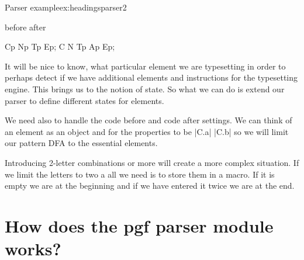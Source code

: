 \begin{texexample}{Parser example}{ex:headingsparser2}
\bgroup
\makeatletter
{}
          
{\boxanelement{\setchapterfont\chaptername}}
{\boxanelement{\setnumberfont\thechapter}} 
{} 
{\breakline} 
{before } 
{after } 

{}

{}

{}

\def\boxanelement#1{\fbox{\LARGE#1 }}
\def\breakline{\par\nointerlineskip}
Cp Np Tp Ep;
\medskip
{}C N Tp Ap Ep;
\makeatother
\egroup
\end{texexample}

It will be nice to know, what particular element we are typesetting in order to perhaps detect if we have additional elements and instructions for the typesetting engine. This brings us to the notion of state. So what we can do is extend our parser to define different states for elements. 

We need also to handle the code before and code after settings. We can think of an element as an object and for the properties to be |C.a| |C.b| so we will limit our pattern DFA to the essential elements. 

Introducing 2-letter combinations or more will create a more complex situation. If we limit the letters to two a
all we need is to store them in a macro. If it is empty we are at the beginning and if we have entered it twice we are at the end. 

\section{How does the pgf parser module works?}

